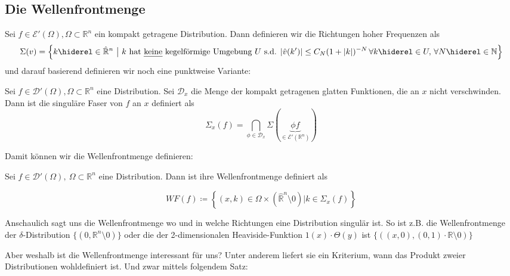 \subsection{Die Wellenfrontmenge}
\begin{definition}
\label{def:high_frequency_set}
Sei $f \in \mathcal{E}'(\Omega), \Omega \subset \mathbb{R}^n$ ein kompakt getragene Distribution. Dann definieren wir die Richtungen hoher Frequenzen als
\begin{dmath*}
\Sigma (v) = \left\{k \hiderel \in \hat{\mathbb{R}}^n ~\big|~ k \textrm{ hat \emph{keine} kegelförmige Umgebung $U$ s.d. } \\ |\hat v (k')| \leq C_N(1+|k|)^{-N} \, \forall k \hiderel\in U,\, \forall N  \hiderel\in \mathbb{N} \right\}
\end{dmath*}
und darauf basierend definieren wir noch eine punktweise Variante:

Sei $f \in \mathcal{D}'(\Omega), \Omega \subset \mathbb{R}^n$ eine Distribution.
Sei $\mathcal{D}_x$ die Menge der kompakt getragenen glatten Funktionen, die an $x$ nicht verschwinden.
Dann ist die singuläre Faser von $f$ an $x$ definiert als
\begin{dmath*}
\Sigma_x (f) = \bigcap \limits_{\phi \in \mathcal{D}_x} \Sigma (\underbrace{\phi f}_{\in \mathcal{E}'(\mathbb{R}^n)})
\end{dmath*}
\end{definition}

Damit können wir die Wellenfrontmenge definieren:

\begin{definition}[Wellenfrontmenge]
\label{def:wavefrontset}
Sei $f \in \mathcal{D}'(\Omega), ~\Omega \subset \mathbb{R}^n$ eine Distribution. Dann ist ihre Wellenfrontmenge definiert als

\begin{equation*}
WF(f)  \coloneqq \left\{
	(x,k) \in \Omega \times (\hat{\mathbb{R}}^n \setminus 0)
	\Big | k \in \Sigma_x(f)
	\right\}
\end{equation*}
\end{definition}

Anschaulich sagt uns die Wellenfrontmenge wo und in welche Richtungen eine Distribution singulär ist. So ist z.B. die Wellenfrontmenge der $\delta$-Distribution $\{(0, \mathbb{R}^n \setminus 0)\}$ oder die der 2-dimensionalen Heaviside-Funktion $1(x)\cdot\Theta(y)$ ist $\{((x,0),(0,1)\cdot \mathbb{R}\setminus 0)\}$

Aber weshalb ist die Wellenfrontmenge interessant für uns? Unter anderem liefert sie ein Kriterium, wann das Produkt zweier Distributionen wohldefiniert ist. Und zwar mittels folgendem Satz:

